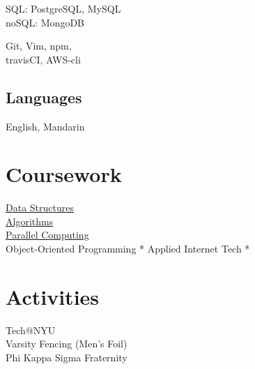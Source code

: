 \documentclass[]{hieudo-build}
\begin{document}
\begin{minipage}[t]{0.34\textwidth}
SQL: PostgreSQL, MySQL\\
noSQL: MongoDB
\newline

Git, Vim, npm,\\
travisCI, AWS-cli

\sectionsep
\subsection{Languages}
 English, Mandarin\\
\sectionsep

\section{Coursework}
\href{https://github.com/JasonYao/Fall2014NYU-DataStructures}{Data Structures}\\
\href{https://github.com/JasonYao/Algorithmic-Problem-Solving}{Algorithms}\\

\href{https://github.com/JasonYao?utf8=\%E2\%9C\%93\&tab=repositories\&q=parallel\&type=\&language=}{Parallel Computing}\\
Object-Oriented Programming *
Applied Internet Tech *
\newline

\sectionsep

\section{Activities}
Tech@NYU\\
Varsity Fencing (Men's Foil)\\
Phi Kappa Sigma Fraternity
\sectionsep



\sectionsep
{}

%
%
\end{minipage} 
\end{document}
